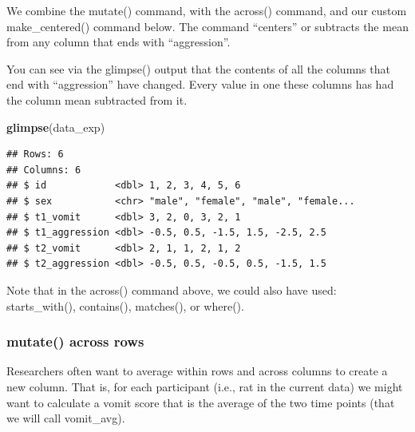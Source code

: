 \documentclass[
]{krantz}
\makeatletter
\newenvironment{Shaded}{\begin{snugshade}}{\end{snugshade}}
\newcommand{\DataTypeTok}[1]{\textcolor[rgb]{0.27,0.27,0.27}{#1}}
\newcommand{\KeywordTok}[1]{\textcolor[rgb]{0.27,0.27,0.27}{\textbf{#1}}}
\newcommand{\NormalTok}[1]{#1}
\newcommand{\OperatorTok}[1]{\textcolor[rgb]{0.43,0.43,0.43}{\textbf{#1}}}
\newcommand{\StringTok}[1]{\textcolor[rgb]{0.5,0.5,0.5}{#1}}
\newenvironment{kframe}{%
\medskip{}
\setlength{\fboxsep}{.8em}
 \def\at@end@of@kframe{}%
 \ifinner\ifhmode%
  \def\at@end@of@kframe{\end{minipage}}%
  \begin{minipage}{\columnwidth}%
 \fi\fi%
 \def\FrameCommand##1{\hskip\@totalleftmargin \hskip-\fboxsep
 \colorbox{shadecolor}{##1}\hskip-\fboxsep
     \hskip-\linewidth \hskip-\@totalleftmargin \hskip\columnwidth}%
 \MakeFramed {\advance\hsize-\width
   \@totalleftmargin\z@ \linewidth\hsize
   \@setminipage}}%
 {\par\unskip\endMakeFramed%
 \at@end@of@kframe}
\renewenvironment{Shaded}{\begin{kframe}}{\end{kframe}}
\makeatother
\begin{document}
We combine the mutate() command, with the across() command, and our custom make\_centered() command below. The command ``centers'' or subtracts the mean from any column that ends with ``aggression''.

\begin{Shaded}
\end{Shaded}

You can see via the glimpse() output that the contents of all the columns that end with ``aggression'' have changed. Every value in one these columns has had the column mean subtracted from it.

\begin{Shaded}
\begin{Highlighting}[]
\KeywordTok{glimpse}\NormalTok{(data_exp)}
\end{Highlighting}
\end{Shaded}

\begin{verbatim}
## Rows: 6
## Columns: 6
## $ id            <dbl> 1, 2, 3, 4, 5, 6
## $ sex           <chr> "male", "female", "male", "female...
## $ t1_vomit      <dbl> 3, 2, 0, 3, 2, 1
## $ t1_aggression <dbl> -0.5, 0.5, -1.5, 1.5, -2.5, 2.5
## $ t2_vomit      <dbl> 2, 1, 1, 2, 1, 2
## $ t2_aggression <dbl> -0.5, 0.5, -0.5, 0.5, -1.5, 1.5
\end{verbatim}

Note that in the across() command above, we could also have used: starts\_with(), contains(), matches(), or where().

\hypertarget{mutate-across-rows}{%
\subsubsection{mutate() across rows}\label{mutate-across-rows}}

Researchers often want to average within rows and across columns to create a new column. That is, for each participant (i.e., rat in the current data) we might want to calculate a vomit score that is the average of the two time points (that we will call vomit\_avg).
\end{document}
